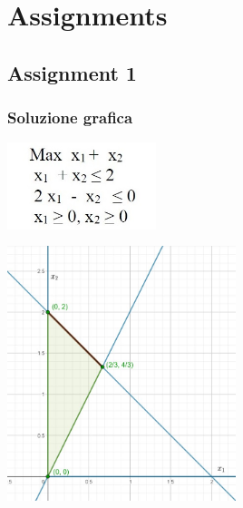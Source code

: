 \documentclass[12pt, a4paper, openany]{book}
\begin{document}
\chapter{Assignments}

\section{Assignment 1}

\subsection{Soluzione grafica}
\begin{center}
    \includegraphics[width=0.325\textwidth]{Assignment1_es1Q.jpg}
\end{center}
\begin{center}
    \includegraphics[width=0.5\textwidth]{Assignment1_es1A.jpg}
\end{center}
\vspace{1cm}
\end{document}
